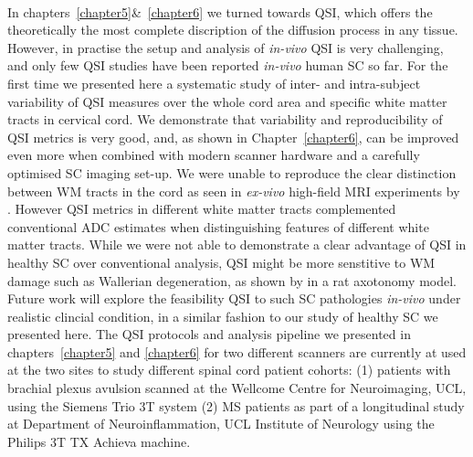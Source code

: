 \paragraph{}
In chapters~\ref{chapter5}\&~\ref{chapter6} we turned towards \gls{QSI}, which offers the theoretically the most complete discription of the diffusion process in any tissue. However, in practise the setup and analysis of \emph{in-vivo} \gls{QSI} is very challenging, and only few \gls{QSI} studies have been reported \emph{in-vivo} human {\gls{SC}} so far. For the first time we presented here a systematic study of inter- and intra-subject variability of \gls{QSI} measures over the whole cord area and specific white matter tracts in cervical cord. We demonstrate that variability and reproducibility of \gls{QSI} metrics is very good, and, as shown in Chapter~\ref{chapter6}, can be improved even more when combined with modern scanner hardware and a carefully optimised \gls{SC} imaging set-up. We were unable to reproduce the clear distinction between WM tracts in the cord as seen in \emph{ex-vivo} high-field MRI experiments by \citet{Ong:2012}. However \gls{QSI} metrics in different white matter tracts complemented conventional \gls{ADC} estimates when distinguishing features of different white matter tracts. While we were not able to demonstrate a clear advantage of \gls{QSI} in healthy SC over conventional analysis, \gls{QSI} might be more senstitive to WM damage such as Wallerian degeneration, as shown by \citet{Farrell:2010} in a rat axotonomy model. Future work will explore the feasibility \gls{QSI} to such SC pathologies \emph{in-vivo} under realistic clincial condition, in a similar fashion to our study of healthy SC we presented here. The \gls{QSI} protocols and analysis pipeline we presented in chapters~\ref{chapter5} and \ref{chapter6} for two different scanners are currently at used at the two sites to study different spinal cord patient cohorts: (1) patients with brachial plexus avulsion scanned at the Wellcome Centre for Neuroimaging, UCL, using the Siemens Trio 3T system (2) \gls{MS} patients as part of a longitudinal study at Department of Neuroinflammation, UCL Institute of Neurology using the Philips 3T TX Achieva machine.

